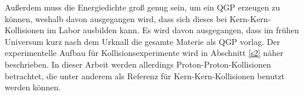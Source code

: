 Au{\ss}erdem muss die Energiedichte gro{\ss} genug sein, um ein QGP erzeugen zu k\"onnen, weshalb davon ausgegangen wird, dass sich dieses bei Kern-Kern-Kollisionen im Labor ausbilden kann.
Es wird davon ausgegangen, dass im fr\"uhen Universum kurz nach dem Urknall die gesamte Materie als QGP vorlag.
\newline
Der experimentelle Aufbau f\"ur Kollisionsexperimente wird in Abschnitt \ref{s2} n\"aher beschrieben.
In dieser Arbeit werden allerdings Proton-Proton-Kollisionen betrachtet, die unter anderem als Referenz f\"ur Kern-Kern-Kollisionen benutzt werden k\"onnen. 




